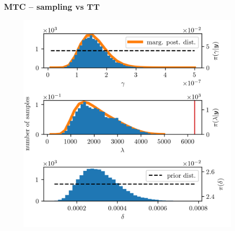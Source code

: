 \subsubsection{MTC --  sampling vs TT}
\begin{figure}[ht!]
	\centering
	\includegraphics{secSIRTMargMargO3Res.png}
	\caption[]{}
	\label{fig:MargPostHistTT}
\end{figure}
